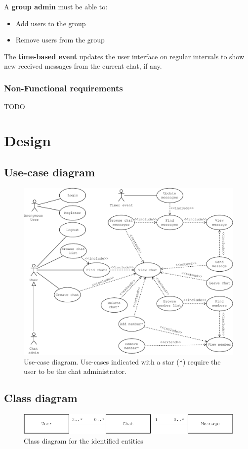 \documentclass[10pt]{article}
\begin{document}
A \textbf{group admin} must be able to:
\begin{itemize}
    \item Add users to the group
    \item Remove users from the group
\end{itemize}

The \textbf{time-based event} updates the user interface on regular intervals
to show new received messages from the current chat, if any.

\subsubsection{Non-Functional requirements}
TODO

\clearpage
\section{Design}
\subsection{Use-case diagram}
\begin{figure}[h!]
    \centering
    \includegraphics[width=\textwidth]{figs/use_case_diagram}
    \caption{Use-case diagram. Use-cases indicated with a star (\texttt{*})
        require the user to be the chat administrator.}
    \label{fig:usecase}
\end{figure}

\subsection{Class diagram}
\begin{figure}[h!]
    \centering
    \includegraphics[width=\textwidth]{figs/class_diagram}
    \caption{Class diagram for the identified entities}
    \label{fig:class_diagram}
\end{figure}
\end{document}
